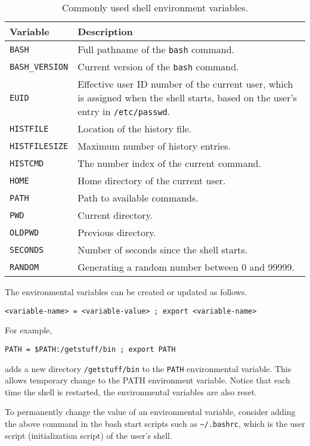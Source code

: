 \begin{table}
	\centering \caption{Commonly used shell environment variables.}\label{ch:sb:tab:shellenvironmentvars}
	\begin{tabularx}{\textwidth}{lX}
		\hline
		Variable & Description \\ \hline
		\verb|BASH| & Full pathname of the \verb|bash| command. \\ \hdashline
		\verb|BASH_VERSION| & Current version of the \verb|bash| command. \\ \hdashline
		\verb|EUID| & Effective user ID number of the current user, which is assigned when the shell starts, based on the user's entry in \verb|/etc/passwd|. \\ \hdashline
		\verb|HISTFILE| & Location of the history file. \\ \hdashline
		\verb|HISTFILESIZE| & Maximum number of history entries. \\ \hdashline
		\verb|HISTCMD| & The number index of the current command. \\ \hdashline
		\verb|HOME| & Home directory of the current user. \\ \hdashline
		\verb|PATH| & Path to available commands. \\ \hdashline
		\verb|PWD| & Current directory. \\ \hdashline
		\verb|OLDPWD| & Previous directory. \\ \hdashline
		\verb|SECONDS| & Number of seconds since the shell starts. \\ \hdashline
		\verb|RANDOM| & Generating a random number between 0 and 99999. \\
		\hline
	\end{tabularx}
\end{table}

The environmental variables can be created or updated as follows.
\begin{lstlisting}
<variable-name> = <variable-value> ; export <variable-name>
\end{lstlisting}
For example,
\begin{lstlisting}
PATH = $PATH:/getstuff/bin ; export PATH
\end{lstlisting}
adds a new directory \verb|/getstuff/bin| to the \verb|PATH| environmental variable. This allows temporary change to the PATH environment variable. Notice that each time the shell is restarted, the environmental variables are also reset. 

To permanently change the value of an environmental variable, consider adding the above command in the bash start scripts such as \verb|~/.bashrc|, which is the user script (initialization script) of the user's shell.


